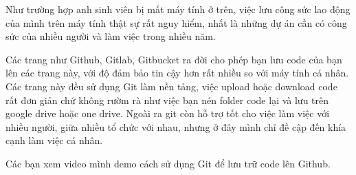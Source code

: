 
Như trường hợp anh sinh viên bị mất máy tính ở trên, việc lưu công sức lao động của mình trên máy tính thật sự rất nguy hiểm, nhất là những dự án cần có công sức của nhiều người và làm việc trong nhiều năm.

Các trang như Github, Gitlab, Gitbucket ra đời cho phép bạn lưu code của bạn lên các trang này, với độ đảm bảo tin cậy hơn rất nhiều so với máy tính cá nhân. Các trang này đều sử dụng Git làm nền tảng, việc upload hoặc download code rất đơn giản chứ không rườm rà như việc bạn nén folder code lại và lưu trên google drive hoặc one drive. Ngoài ra git còn hỗ trợ tốt cho việc làm việc với nhiều người, giữa nhiều tổ chức với nhau, nhưng ở đây mình chỉ đề cập đến khía cạnh làm việc cá nhân.

Các bạn xem video mình demo cách sử dụng Git để lưu trữ code lên Github.

